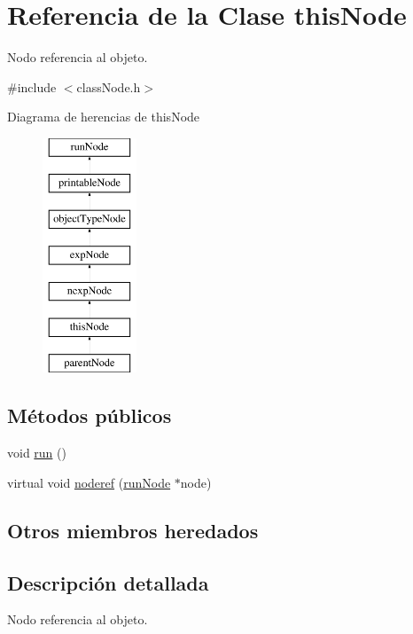 \hypertarget{classthisNode}{\section{Referencia de la Clase this\-Node}
\label{classthisNode}
}


Nodo referencia al objeto.  




{\ttfamily \#include $<$class\-Node.\-h$>$}

Diagrama de herencias de this\-Node\begin{figure}[H]
\begin{center}
\leavevmode
\includegraphics[height=7.000000cm]{classthisNode}
\end{center}
\end{figure}
\subsection*{Métodos públicos}
\begin{DoxyCompactItemize}
\item 
void \hyperlink{classthisNode_a40982d7b797f87d4c99fc2938783df6d}{run} ()
\item 
virtual void \hyperlink{classthisNode_a808f69385aa1ac68ec18dc2ac412449d}{noderef} (\hyperlink{classrunNode}{run\-Node} $\ast$node)
\end{DoxyCompactItemize}
\subsection*{Otros miembros heredados}


\subsection{Descripción detallada}
Nodo referencia al objeto. 

